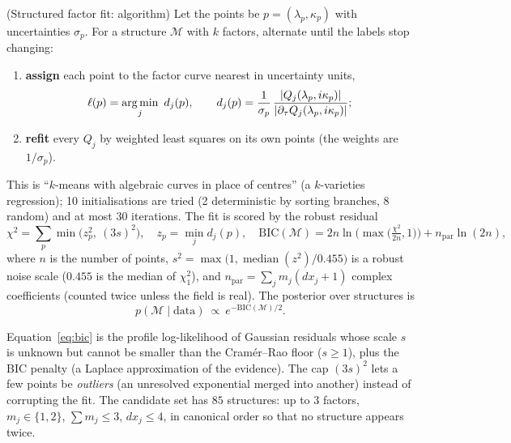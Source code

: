 \begin{theorem}{(Structured factor fit: algorithm)  \impl}\label{thm:structfit}
Let the points be $p=(\lambda_p,\kappa_p)$ with uncertainties $\sigma_p$. For a structure $\mathcal M$ with $k$ factors, alternate until the labels stop changing:
\begin{enumerate}[nosep]
\item \textbf{assign} each point to the factor curve nearest in uncertainty units,
\[
\ell(p)=\argmin_j\ d_j(p),\qquad d_j(p)=\frac{1}{\sigma_p}\,\frac{|Q_j(\lambda_p,i\kappa_p)|}{|\partial_\tau Q_j(\lambda_p,i\kappa_p)|};
\]
\item \textbf{refit} every $Q_j$ by weighted least squares on its own points (the weights are $1/\sigma_p$).
\end{enumerate}
This is ``$k$-means with algebraic curves in place of centres'' (a $k$-varieties regression); 10 initialisations are tried (2 deterministic by sorting branches, 8 random) and at most 30 iterations. The fit is scored by the robust residual
\begin{equation}\label{eq:bic}
\chi^2=\sum_p\min\big(z_p^2,\ (3s)^2\big),\quad z_p=\min_jd_j(p),\quad
\mathrm{BIC}(\mathcal M)=2n\ln\!\Big(\max\Big(\tfrac{\chi^2}{2n},1\Big)\Big)+n_{\mathrm{par}}\ln(2n),
\end{equation}
where $n$ is the number of points, $s^2=\max\big(1,\operatorname{median}(z^2)/0.455\big)$ is a robust noise scale ($0.455$ is the median of $\chi^2_1$), and $n_{\mathrm{par}}=\sum_jm_j(dx_j+1)$ complex coefficients (counted twice unless the field is real). The posterior over structures is
\begin{equation}\label{eq:postM}
p(\mathcal M\mid\text{data})\ \propto\ e^{-\mathrm{BIC}(\mathcal M)/2}.
\end{equation}
\end{theorem}
\begin{intuition}
Equation~\eqref{eq:bic} is the profile log-likelihood of Gaussian residuals whose scale $s$ is unknown but cannot be smaller than the Cram\'er--Rao floor ($s\ge1$), plus the BIC penalty (a Laplace approximation of the evidence). The cap $(3s)^2$ lets a few points be \emph{outliers} (an unresolved exponential merged into another) instead of corrupting the fit. The candidate set has $85$ structures: up to $3$ factors, $m_j\in\{1,2\}$, $\sum m_j\le3$, $dx_j\le4$, in canonical order so that no structure appears twice.
\end{intuition}

